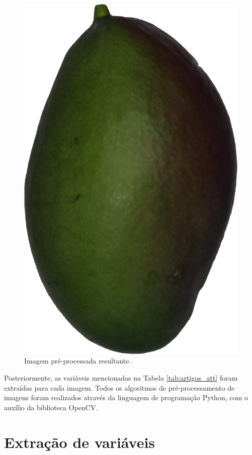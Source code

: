 \begin{figure}[H]
\centering
    \caption{Imagem pré-processada resultante.}\label{fig:prep}
    \includegraphics[scale=0.025]{img/cut.jpg}
\end{figure}

Posteriormente, as variáveis mencionadas na Tabela \ref{tab:artigos_att} foram extraídas para cada imagem. Todos os algoritmos de pré-processamento de imagens foram realizados através da linguagem de programação Python, com o auxílio da biblioteca OpenCV.

\section{Extração de variáveis}


